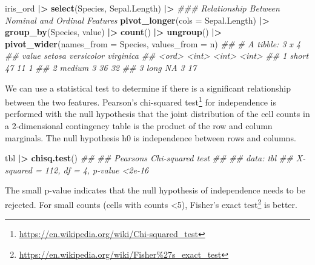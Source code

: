 \documentclass[
  notitlepage]{book}
\newenvironment{Shaded}{\begin{snugshade}}{\end{snugshade}}
\newcommand{\CommentTok}[1]{\textcolor[rgb]{0.56,0.35,0.01}{\textit{#1}}}
\newcommand{\DataTypeTok}[1]{\textcolor[rgb]{0.13,0.29,0.53}{#1}}
\newcommand{\ErrorTok}[1]{\textcolor[rgb]{0.64,0.00,0.00}{\textbf{#1}}}
\newcommand{\KeywordTok}[1]{\textcolor[rgb]{0.13,0.29,0.53}{\textbf{#1}}}
\newcommand{\NormalTok}[1]{#1}
\newcommand{\OperatorTok}[1]{\textcolor[rgb]{0.81,0.36,0.00}{\textbf{#1}}}
\newcommand{\StringTok}[1]{\textcolor[rgb]{0.31,0.60,0.02}{#1}}
\DeclareRobustCommand{\href}[2]{#2\footnote{\url{#1}}}
\begin{document}
\begin{Shaded}
\begin{Highlighting}[]
\NormalTok{iris\_ord }\OperatorTok{|}\ErrorTok{\textgreater{}}
\StringTok{  }\KeywordTok{select}\NormalTok{(Species, Sepal.Length) }\OperatorTok{|}\ErrorTok{\textgreater{}}
\CommentTok{\#\#\# Relationship Between Nominal and Ordinal Features}
\StringTok{  }\KeywordTok{pivot\_longer}\NormalTok{(}\DataTypeTok{cols =}\NormalTok{ Sepal.Length) }\OperatorTok{|}\ErrorTok{\textgreater{}}
\StringTok{  }\KeywordTok{group\_by}\NormalTok{(Species, value) }\OperatorTok{|}\ErrorTok{\textgreater{}}\StringTok{ }
\StringTok{  }\KeywordTok{count}\NormalTok{() }\OperatorTok{|}\ErrorTok{\textgreater{}}\StringTok{ }
\StringTok{  }\KeywordTok{ungroup}\NormalTok{() }\OperatorTok{|}\ErrorTok{\textgreater{}}
\StringTok{  }\KeywordTok{pivot\_wider}\NormalTok{(}\DataTypeTok{names\_from =}\NormalTok{ Species, }\DataTypeTok{values\_from =}\NormalTok{ n)}
\CommentTok{\#\# \# A tibble: 3 x 4}
\CommentTok{\#\#   value  setosa versicolor virginica}
\CommentTok{\#\#   \textless{}ord\textgreater{}   \textless{}int\textgreater{}      \textless{}int\textgreater{}     \textless{}int\textgreater{}}
\CommentTok{\#\# 1 short      47         11         1}
\CommentTok{\#\# 2 medium      3         36        32}
\CommentTok{\#\# 3 long       NA          3        17}
\end{Highlighting}
\end{Shaded}

We can use a statistical test to determine if there is a significant
relationship between the two features. \href{https://en.wikipedia.org/wiki/Chi-squared_test}{Pearson's chi-squared
test} for independence
is performed with the null hypothesis that the joint distribution of the
cell counts in a 2-dimensional contingency table is the product of the
row and column marginals. The null hypothesis h0 is independence between
rows and columns.

\begin{Shaded}
\begin{Highlighting}[]
\NormalTok{tbl }\OperatorTok{|}\ErrorTok{\textgreater{}}\StringTok{ }
\StringTok{  }\KeywordTok{chisq.test}\NormalTok{()}
\CommentTok{\#\# }
\CommentTok{\#\#  Pearson\textquotesingle{}s Chi{-}squared test}
\CommentTok{\#\# }
\CommentTok{\#\# data:  tbl}
\CommentTok{\#\# X{-}squared = 112, df = 4, p{-}value \textless{}2e{-}16}
\end{Highlighting}
\end{Shaded}

The small p-value indicates that the null hypothesis of independence
needs to be rejected. For small counts (cells with counts \textless5),
\href{https://en.wikipedia.org/wiki/Fisher\%27s_exact_test}{Fisher's exact
test} is better.
\end{document}
